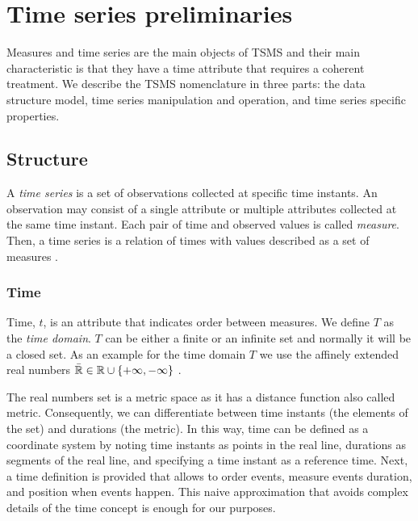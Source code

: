

\section{Time series preliminaries}
\label{sec:model:preliminaries}



Measures and time series are the main objects of TSMS and their main
characteristic is that they have a time attribute that requires a
coherent treatment. We describe the TSMS nomenclature in three parts:
 the data structure model,  time series manipulation and
operation, and  time series specific properties.



\subsection{Structure}


A \emph{time series} is a set of observations collected at specific
time instants. An observation may consist of a single attribute or
multiple attributes collected at the same time instant.  Each pair of
time and observed values is called \emph{measure}. Then, a time series
is a relation of times with values described as a set of measures .





\subsubsection{Time}

Time, $t$, is an attribute that indicates order between measures. We define
$T$ as the \emph{time domain}. $T$ can be either a finite or an infinite set
and normally it will be a closed set. As an example for the time
domain $T$ we use the affinely extended real numbers $\bar{\mathbb{R}} \in \mathbb{R} \cup
\{+\infty,-\infty\}$ \cite{cantrell:extendedreal}.

The real numbers set is a metric space as it has a distance function
also called metric. Consequently, we can differentiate between time
instants (the elements of the set) and durations (the metric). In this
way, time can be defined as a coordinate system
\cite{iep:time-supplement,kopetz11:realtime} by noting time instants
as points in the real line, durations as segments of the real line,
and specifying a time instant as a reference time. Next, a time
definition is provided that allows to order events, measure events
duration, and position when events happen. This naive approximation
that avoids complex details of the time concept is enough for our
purposes.

